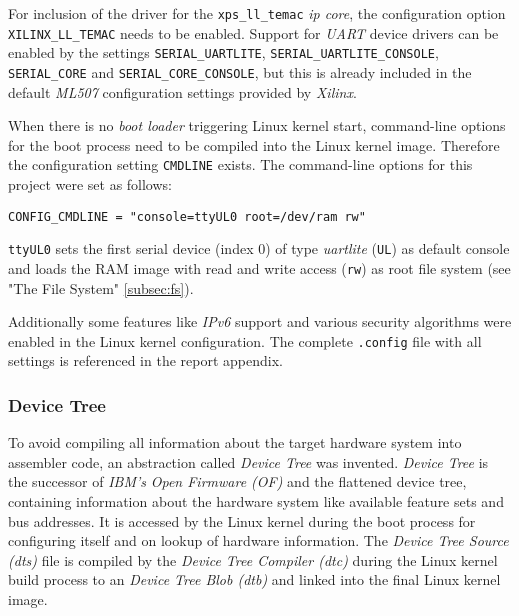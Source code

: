 For inclusion of the driver for the \texttt{xps\_ll\_temac} \textit{\gls{ip} core}, the configuration option \texttt{XILINX\_LL\_TEMAC} needs to be enabled. Support for \textit{UART} device drivers can be enabled by the settings \texttt{SERIAL\_UARTLITE}, \texttt{SERIAL\_UARTLITE\_CONSOLE}, \texttt{SERIAL\_CORE} and \texttt{SERIAL\_CORE\_CONSOLE}, but this is already included in the default \textit{ML507} configuration settings provided by \textit{Xilinx}.

When there is no \textit{boot loader} triggering Linux kernel start, command-line options for the boot process need to be compiled into the Linux kernel image. Therefore the configuration setting \texttt{CMDLINE} exists. The command-line options for this project were set as follows:


\begin{verbatim}
CONFIG_CMDLINE = "console=ttyUL0 root=/dev/ram rw"
\end{verbatim}

\texttt{ttyUL0} sets the first serial device (index 0) of type \textit{uartlite} (\texttt{UL}) as default console and loads the RAM image with read and write access (\texttt{rw}) as root file system (see "The File System" \ref{subsec:fs}).

Additionally some features like \textit{IPv6} support and various security algorithms were enabled in the Linux kernel configuration. The complete \texttt{.config} file with all settings is referenced in the report appendix.

\subsubsection{Device Tree}
\label{subsubsec:device_tree}

To avoid compiling all information about the target hardware system into assembler code, an abstraction called \textit{Device Tree} was invented. \textit{Device Tree} is the successor of \textit{IBM's} \textit{Open Firmware (OF)} and the flattened device tree, containing information about the hardware system like available feature sets and bus addresses. \cite{device_tree} It is accessed by the Linux kernel during the boot process for configuring itself and on lookup of hardware information. The \textit{Device Tree Source (dts)} file is compiled by the \textit{Device Tree Compiler (dtc)} during the Linux kernel build process to an \textit{Device Tree Blob (dtb)} and linked into the final Linux kernel image.

